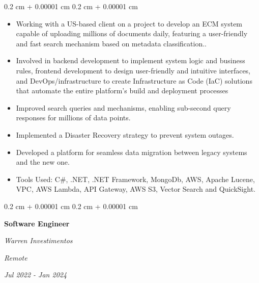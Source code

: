 \documentclass[10pt, letterpaper]{article}
\newenvironment{highlights}{
    \begin{itemize}[
        topsep=0.10 cm,
        parsep=0.10 cm,
        partopsep=0pt,
        itemsep=0pt,
        leftmargin=0.4 cm + 10pt
    ]
}{
    \end{itemize}
} %
\newenvironment{onecolentry}{
    \begin{adjustwidth}{
        0.2 cm + 0.00001 cm
    }{
        0.2 cm + 0.00001 cm
    }
}{
    \end{adjustwidth}
} %
\newenvironment{twocolentry}[2][]{
    \onecolentry
    \def\secondColumn{#2}
    \setcolumnwidth{\fill, 4.5 cm}
    \begin{paracol}{2}
}{
    \switchcolumn \raggedleft \secondColumn
    \end{paracol}
    \endonecolentry
} %
\begin{document}
        \vspace{0.10 cm}
        \begin{onecolentry}
            \begin{highlights}
                \item Working with a US-based client on a project to develop an ECM system capable of uploading millions of documents daily, featuring a user-friendly and fast search mechanism based on metadata classification..
                \item Involved in backend development to implement system logic and business rules, frontend development to design user-friendly and intuitive interfaces, and DevOps/infrastructure to create Infrastructure as Code (IaC) solutions that automate the entire platform's build and deployment processes
                \item Improved search queries and mechanisms, enabling sub-second query responses for millions of data points.
                \item Implemented a Disaster Recovery strategy to prevent system outages.
                \item Developed a platform for seamless data migration between legacy systems and the new one.
                \item Tools Used: C\#, .NET, .NET Framework, MongoDb, AWS, Apache Lucene, VPC, AWS Lambda, API Gateway, AWS S3, Vector Search and QuickSight.
            \end{highlights}
        \end{onecolentry}

        \begin{twocolentry}{
        \textit{Remote}    
            
        \textit{Jul 2022 - Jan 2024}}
            \textbf{Software Engineer}
            
            \textit{Warren Investimentos}
        \end{twocolentry}
\end{document}
